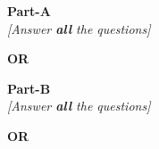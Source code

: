\documentclass{setupFiles/final_exam_sust}
\newcommand{\specialInstruction}{Answer \textbf{all} the questions}
\begin{document}


\begin{center}
    \textbf{\large {Part-A}}\\
     \textit{[\specialInstruction{}]}
\end{center}


\begin{questions}
	


  	 
  	
  	




\begin{center}
\textbf{OR}\\[6pt]
\end{center}	

	


\begin{center}
    \textbf{\large {Part-B}}\\
     \textit{[\specialInstruction{}]}
\end{center}
  	
\cleardoublepage
  	
  	


\begin{center}
\textbf{OR}\\[6pt]
\end{center}	

	

\end{questions}
\vfill
% 


\ifprintanswers
\else
\fi

\label{endofquestions}

\ifprintTOS
    \cleardoublepage
    \thispagestyle{empty} %
    
\fi
\end{document}
